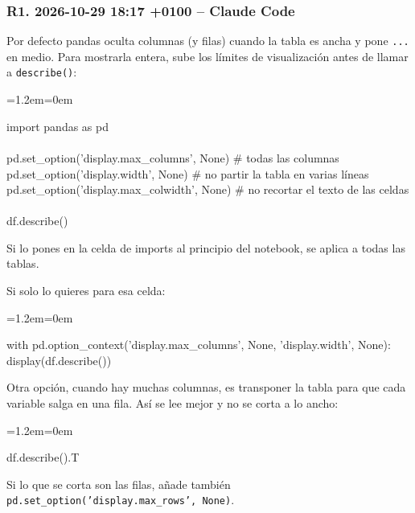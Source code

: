 \documentclass[11pt,a4paper]{article}
\newenvironment{codigo}
  {\par\smallskip\begin{list}{}{\leftmargin=1.2em\rightmargin=0em}\item\relax\ttfamily\scriptsize\raggedright}
  {\end{list}\smallskip}
\begin{document}
\subsubsection*{R1. 2026-10-29 18:17 +0100 -- Claude Code}
{\small
Por defecto pandas oculta columnas (y filas) cuando la tabla es ancha y pone \texttt{...} en medio. Para mostrarla entera, sube los límites de visualización antes de llamar a \texttt{describe()}:

\begin{codigo}
import pandas as pd \\{}
\mbox{} \\{}
pd.set\_\allowbreak{}option('display.max\_\allowbreak{}columns', None)   \# todas las columnas \\{}
pd.set\_\allowbreak{}option('display.width', None)         \# no partir la tabla en varias líneas \\{}
pd.set\_\allowbreak{}option('display.max\_\allowbreak{}colwidth', None)  \# no recortar el texto de las celdas \\{}
\mbox{} \\{}
df.describe()
\end{codigo}
Si lo pones en la celda de imports al principio del notebook, se aplica a todas las tablas.

Si solo lo quieres para esa celda:

\begin{codigo}
with pd.option\_\allowbreak{}context('display.max\_\allowbreak{}columns', None, 'display.width', None): \\{}
\hspace*{2.08em}display(df.describe())
\end{codigo}
Otra opción, cuando hay muchas columnas, es transponer la tabla para que cada variable salga en una fila. Así se lee mejor y no se corta a lo ancho:

\begin{codigo}
df.describe().T
\end{codigo}
Si lo que se corta son las filas, añade también \texttt{pd.set\_\allowbreak{}option('display.max\_\allowbreak{}rows', None)}.

}
\end{document}
